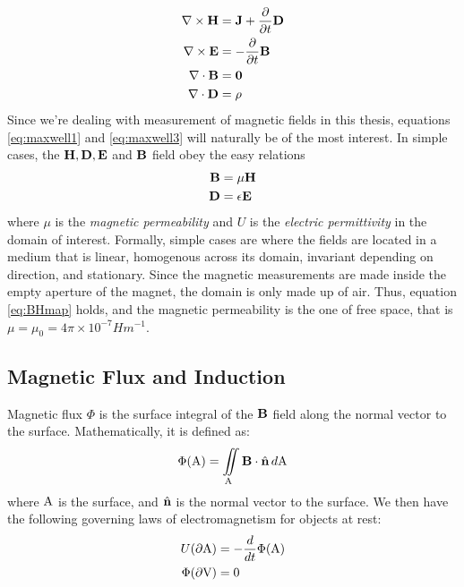 \begin{align}
    \nabla \times \vb{H} & = \vb{J} + \frac{\partial}{\partial t}\vb{D}
    \label{eq:maxwell1}                                                 \\
    \nabla \times \vb{E} & = -\frac{\partial}{\partial t}\vb{B}
    \label{eq:maxwell2}                                                 \\
    \nabla \cdot \vb{B}  & = \vb{0}
    \label{eq:maxwell3}                                                 \\
    \nabla \cdot \vb{D}  & = \rho
    \label{eq:maxwell4}
\end{align}
Since we're dealing with measurement of magnetic fields in this thesis,
equations \ref{eq:maxwell1} and \ref{eq:maxwell3} will naturally be of
the most interest. In simple cases, the $\vb{H}, \vb{D}, \vb{E}$ and
$\vb{B}$ field obey the easy relations
\begin{align}
    \vb{B} & = \mu \vb{H}
    \label{eq:BHmap}           \\
    \vb{D} & = \epsilon \vb{E}
\end{align}
where $\mu$ is the \emph{magnetic permeability} and $U$ is the
\emph{electric permittivity} in the domain of interest.
Formally, simple cases are where the fields are located in a medium that is
linear, homogenous across its domain, invariant depending on direction, and
stationary. Since the magnetic measurements are made inside the empty aperture
of the magnet, the domain is only made up of air. Thus, equation \ref{eq:BHmap}
holds, and the magnetic permeability is the one of free space, that is
$\mu = \mu_0 = 4\pi \times 10^{-7} Hm^{-1}$. \cite[Ch.4.1-4.4]{russenschuck2011field}


\subsection{Magnetic Flux and Induction}
Magnetic flux $\Phi$ is the surface integral of the $\vb{B}$ field
along the normal vector to the surface.
Mathematically, it is defined as:
\begin{equation}
    \Phi(\mathrm{A}) = \iint\limits_{\mathrm{A}} \vb{B} \cdot \hat{\vb{n}}\, d\mathrm{A}
\end{equation}
where $\mathrm{A}$ is the surface, and $\hat{\vb{n}}$ is the normal vector to the surface.
We then have the following governing laws of electromagnetism for objects at rest:
\begin{align}
    U(\partial\mathrm{A})      & = -\frac{d}{dt}\Phi(\mathrm{A})
    \label{eq:faraday}                                 \\
    \Phi(\partial\mathrm{V}) & = 0
    \label{eq:fluxcons}
\end{align}

